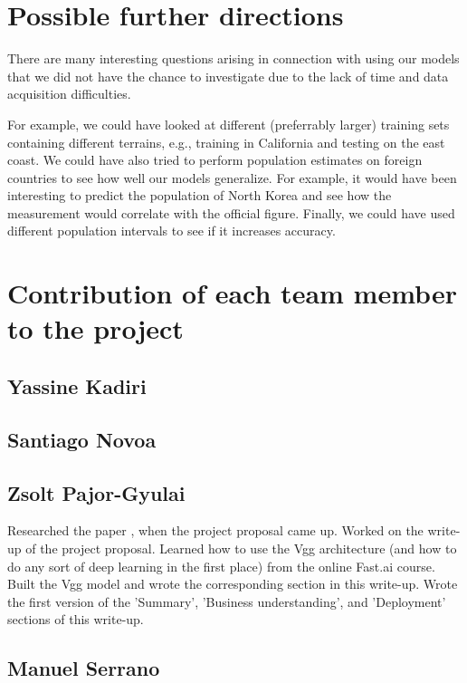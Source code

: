 \documentclass{article}
\begin{document}
\section{Possible further directions}

There are many interesting questions arising in connection with using our models that we did not have the chance to investigate due to the lack of time and data acquisition difficulties.

For example, we could have looked at different (preferrably larger) training sets containing different terrains, e.g., training in California and testing on the east coast. We could have also tried to perform population estimates on foreign countries to see how well our models generalize. For example, it would have been interesting to predict the population of North Korea and see how the measurement would correlate with the official figure. Finally, we could have used different population intervals to see if it increases accuracy.

\appendix
\section{Contribution of each team member to the project}
\subsection{Yassine Kadiri}
\subsection{Santiago Novoa}
\subsection{Zsolt Pajor-Gyulai}
Researched the paper \cite{RHD17}, when the project proposal came up. Worked on the write-up of the project proposal. Learned how to use the Vgg architecture (and how to do any sort of deep learning in the first place) from the online Fast.ai course. Built the Vgg model and wrote the corresponding section in this write-up. Wrote the first version of the 'Summary', 'Business understanding', and 'Deployment' sections of this write-up.
\subsection{Manuel Serrano}
\end{document}
